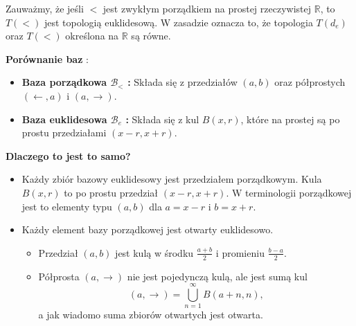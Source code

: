 \begin{eg}[1.2.8 $T(<) = T(d_e)$]	
\noindent Zauważmy, że jeśli $<$ jest zwykłym porządkiem na prostej rzeczywistej $\mathbb{R}$, to $T\left( < \right) $ jest topologią euklidesową. W zasadzie oznacza to, że topologia $T\left( d_{e} \right) $ oraz $T\left( < \right) $ określona na $\mathbb{R}$ są równe.

\noindent \textbf{Porównanie baz} :
\begin{itemize}
	\item \textbf{Baza porządkowa $\mathcal{B}_{<}$ :} Składa się z przedziałów $\left( a,b \right) $ oraz półprostych $\left( \leftarrow , a \right) $ i $\left( a, \rightarrow  \right) $.
	\item \textbf{Baza euklidesowa $\mathcal{B}_{e}$ :} Składa się z kul $B\left( x,r \right) $, które na prostej są po prostu przedziałami $\left( x-r, x+r \right) $.
\end{itemize}
\noindent \textbf{Dlaczego to jest to samo?}
\begin{itemize}
	\item Każdy zbiór bazowy euklidesowy jest przedziałem porządkowym. Kula $B\left( x,r \right) $ to po prostu przedział $\left( x-r,x+r \right) $. W terminologii porządkowej jest to elementy typu $\left( a,b \right) $ dla $a = x-r$ i $b = x+r$. 
	\item Każdy element bazy porządkowej jest otwarty euklidesowo.
		\begin{itemize}
			\item Przedział $\left( a,b \right) $ jest kulą w środku $\tfrac{a+b}{2}$ i promieniu $\tfrac{b-a}{2}$.
			\item Półprosta $\left( a, \rightarrow  \right) $ nie jest pojedynczą kulą, ale jest sumą kul
				\[
					\left( a, \rightarrow  \right) = \bigcup_{n=1}^{\infty}B\left( a+n, n \right) 
				,\] 
			a jak wiadomo suma zbiorów otwartych jest otwarta.
		\end{itemize}
\end{itemize}
\end{eg}
